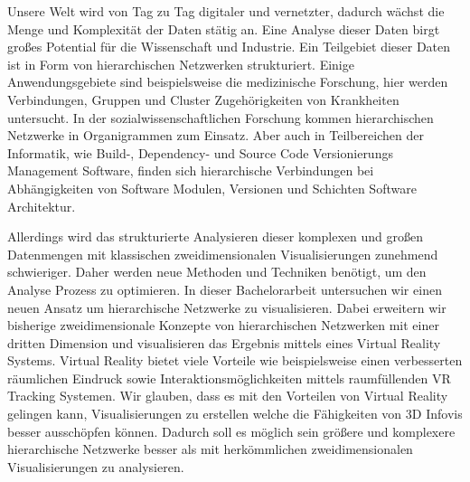 Unsere Welt wird von Tag zu Tag digitaler und vernetzter, dadurch wächst die Menge und Komplexität der Daten stätig an.
Eine Analyse dieser Daten birgt großes Potential für die Wissenschaft und Industrie.
Ein Teilgebiet dieser Daten ist in Form von hierarchischen Netzwerken strukturiert. Einige Anwendungsgebiete sind beispielsweise die medizinische Forschung, hier werden Verbindungen, Gruppen und Cluster Zugehörigkeiten von Krankheiten untersucht. In der sozialwissenschaftlichen Forschung kommen hierarchischen Netzwerke in Organigrammen zum Einsatz. Aber auch in Teilbereichen der Informatik, wie Build-, Dependency- und Source Code Versionierungs Management Software, finden sich hierarchische Verbindungen bei Abhängigkeiten von Software Modulen, Versionen und Schichten Software Architektur. 

Allerdings wird das strukturierte Analysieren dieser komplexen und großen Datenmengen mit klassischen zweidimensionalen Visualisierungen zunehmend schwieriger.
Daher werden neue Methoden und Techniken benötigt, um den Analyse Prozess zu optimieren. In dieser Bachelorarbeit untersuchen wir einen neuen Ansatz um hierarchische Netzwerke zu visualisieren. Dabei erweitern wir bisherige zweidimensionale Konzepte von hierarchischen Netzwerken mit einer dritten Dimension und visualisieren das Ergebnis mittels eines Virtual Reality Systems. Virtual Reality bietet viele Vorteile wie beispielsweise einen verbesserten räumlichen Eindruck sowie Interaktionsmöglichkeiten mittels raumfüllenden VR Tracking Systemen. 
Wir glauben, dass es mit den Vorteilen von Virtual Reality gelingen kann, Visualisierungen zu erstellen welche die Fähigkeiten von 3D Infovis besser ausschöpfen können. Dadurch soll es möglich sein größere und komplexere hierarchische Netzwerke besser als mit herkömmlichen zweidimensionalen Visualisierungen zu analysieren.